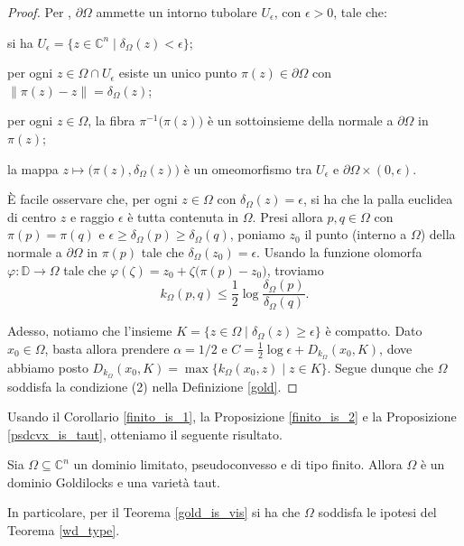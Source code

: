 \begin{proof}
    Per \cite[Lemma 2.1]{BB}, $\partial\Omega$ ammette un intorno tubolare $U_\epsilon$, con $\epsilon>0$, tale che:
    \begin{nlist}
        \item si ha $U_\epsilon=\{z\in\mathbb{C}^n\mid\delta_\Omega(z)<\epsilon\}$;
        \item per ogni $z\in\Omega\cap U_\epsilon$ esiste un unico punto $\pi(z)\in\partial\Omega$ con $\|\pi(z)-z\|=\delta_\Omega(z)$;
        \item per ogni $z\in\Omega$, la fibra $\pi^{-1}\big(\pi(z)\big)$ è un sottoinsieme della normale a $\partial\Omega$ in $\pi(z)$;
        \item la mappa $z\longmapsto\big(\pi(z),\delta_\Omega(z)\big)$ è un omeomorfismo tra $U_\epsilon$ e $\partial\Omega\times(0,\epsilon)$.
    \end{nlist}
    È facile osservare che, per ogni $z\in\Omega$ con $\delta_\Omega(z)=\epsilon$, si ha che la palla euclidea di centro $z$ e raggio $\epsilon$ è tutta contenuta in $\Omega$. Presi allora $p,q\in\Omega$ con $\pi(p)=\pi(q)$ e $\epsilon\ge\delta_\Omega(p)\ge\delta_\Omega(q)$, poniamo $z_0$ il punto (interno a $\Omega$) della normale a $\partial\Omega$ in $\pi(p)$ tale che $\delta_\Omega(z_0)=\epsilon$. Usando la funzione olomorfa $\varphi:\mathbb{D}\longrightarrow\Omega$ tale che $\varphi(\zeta)=z_0+\zeta\big(\pi(p)-z_0\big)$, troviamo
    $$k_\Omega(p,q) \le \dfrac{1}{2}\log{\dfrac{\delta_\Omega(p)}{\delta_\Omega(q)}}.$$

    Adesso, notiamo che l'insieme $K=\{z\in\Omega\mid\delta_\Omega(z)\ge\epsilon\}$ è compatto. Dato $x_0\in\Omega$, basta allora prendere $\alpha=1/2$ e $C=\frac{1}{2}\log{\epsilon}+D_{k_{\Omega}}(x_0,K)$, dove abbiamo posto $D_{k_\Omega}(x_0,K)=\max\{k_\Omega(x_0,z)\mid z\in K\}$. Segue dunque che $\Omega$ soddisfa la condizione (2) nella Definizione \ref{gold}.
\end{proof}

Usando il Corollario \ref{finito_is_1}, la Proposizione \ref{finito_is_2} e la Proposizione \ref{psdcvx_is_taut}, otteniamo il seguente risultato.

\begin{cor}
    Sia $\Omega\subseteq\mathbb{C}^n$ un dominio limitato, pseudoconvesso e di tipo finito. Allora $\Omega$ è un dominio Goldilocks e una varietà taut.
    
    In particolare, per il Teorema \ref{gold_is_vis} si ha che $\Omega$ soddisfa le ipotesi del Teorema \ref{wd_type}.
\end{cor}